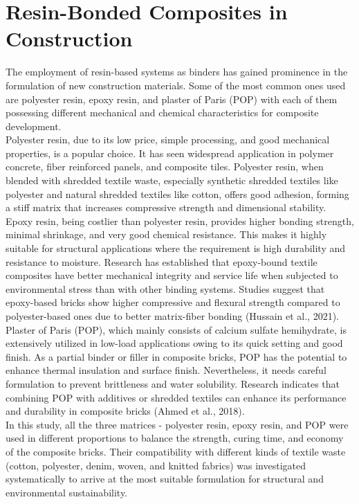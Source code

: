 \section{Resin-Bonded Composites in Construction}
The employment of resin-based systems as binders has gained prominence in the formulation of new construction materials. Some of the most common ones used are polyester resin, epoxy resin, and plaster of Paris (POP) with each of them possessing different mechanical and chemical characteristics for composite development. \\

\noindent Polyester resin, due to its low price, simple processing, and good mechanical properties, is a popular choice. It has seen widespread application in polymer concrete, fiber reinforced panels, and composite tiles. Polyester resin, when blended with shredded textile waste, especially synthetic shredded textiles like polyester and natural shredded textiles like cotton, offers good adhesion, forming a stiff matrix that increases compressive strength and dimensional stability. Epoxy resin, being costlier than polyester resin, provides higher bonding strength, minimal shrinkage, and very good chemical resistance. This makes it highly suitable for structural applications where the requirement is high durability and resistance to moisture. Research has established that epoxy-bound textile composites have better mechanical integrity and service life when subjected to environmental stress than with other binding systems. Studies suggest that epoxy-based bricks show higher compressive and flexural strength compared to polyester-based ones due to better matrix-fiber bonding (Hussain et al., 2021). Plaster of Paris (POP), which mainly consists of calcium sulfate hemihydrate, is extensively utilized in low-load applications owing to its quick setting and good finish. As a partial binder or filler in composite bricks, POP has the potential to enhance thermal insulation and surface finish. Nevertheless, it needs careful formulation to prevent brittleness and water solubility. Research indicates that combining POP with additives or shredded textiles can enhance its performance and durability in composite bricks (Ahmed et al., 2018). \\

\noindent In this study, all the three matrices - polyester resin, epoxy resin, and POP were used in different proportions to balance the strength, curing time, and economy of the composite bricks. Their compatibility with different kinds of textile waste (cotton, polyester, denim, woven, and knitted fabrics) was investigated systematically to arrive at the most suitable formulation for structural and environmental sustainability. \\


